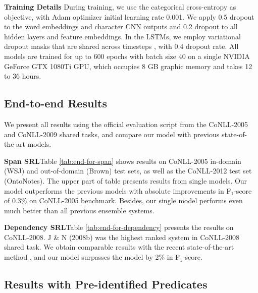 \documentclass[letterpaper]{article} \usepackage{aaai19}  \usepackage{times}  \usepackage{helvet}  \usepackage{courier}  \usepackage{url}  \usepackage{graphicx}  \frenchspacing  \setlength{\pdfpagewidth}{8.5in}  \setlength{\pdfpageheight}{11in}
\begin{document}
\noindent \textbf{Training Details} \quad
During training, we use the categorical cross-entropy as objective, with Adam optimizer \cite{adam2015} initial learning rate 0.001. We apply 0.5 dropout to the word embeddings and character CNN outputs and 0.2 dropout to all hidden layers and feature embeddings. In the LSTMs, we employ variational dropout masks that are shared across timesteps \cite{gal2016}, with 0.4 dropout rate. All models are trained for up to 600 epochs with batch size 40 on a single NVIDIA GeForce GTX 1080Ti GPU, which occupies 8 GB graphic memory and takes 12 to 36 hours.



\subsection{End-to-end Results}
We present all results using the official evaluation script from the CoNLL-2005 and CoNLL-2009 shared tasks, and compare our model with previous state-of-the-art models.
 
\noindent \textbf{Span SRL}\quad Table \ref{tab:end-for-span} shows results on CoNLL-2005 in-domain (WSJ) and out-of-domain (Brown) test sets, as well as the CoNLL-2012 test set (OntoNotes). The upper part of table presents results from single models. Our model outperforms the previous models with absolute improvements in F$_1$-score of 0.3\% on CoNLL-2005 benchmark. Besides, our single model performs even much better than all previous ensemble systems.


\noindent \textbf{Dependency SRL}\quad Table \ref{tab:end-for-dependency} presents the results on CoNLL-2008. J \& N (2008b) \cite{Johansson2008Dependency} was the highest ranked system in CoNLL-2008 shared task. We obtain comparable results with the recent state-of-the-art method \cite{cai2018full}, and our model surpasses the model \cite{he:2018Syntax} by 2\% in F$_1$-score. 



\subsection{Results with Pre-identified Predicates}
\end{document}
